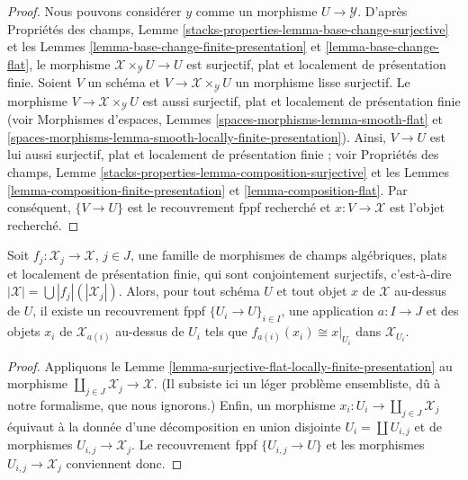 \begin{proof}
Nous pouvons considérer $y$ comme un morphisme $U \to \mathcal{Y}$. D'après
Propriétés des champs, Lemme
\ref{stacks-properties-lemma-base-change-surjective}
et les Lemmes \ref{lemma-base-change-finite-presentation} et
\ref{lemma-base-change-flat}, le morphisme
$\mathcal{X} \times_\mathcal{Y} U \to U$ est surjectif, plat et localement de
présentation finie. Soient $V$ un schéma et
$V \to \mathcal{X} \times_\mathcal{Y} U$ un morphisme lisse surjectif.
Le morphisme $V \to \mathcal{X} \times_\mathcal{Y} U$ est aussi surjectif,
plat et localement de présentation finie (voir
Morphismes d'espaces, Lemmes
\ref{spaces-morphisms-lemma-smooth-flat} et
\ref{spaces-morphisms-lemma-smooth-locally-finite-presentation}). Ainsi,
$V \to U$ est lui aussi surjectif, plat et localement de présentation finie ;
voir Propriétés des champs, Lemme
\ref{stacks-properties-lemma-composition-surjective}
et les Lemmes \ref{lemma-composition-finite-presentation} et
\ref{lemma-composition-flat}. Par conséquent, $\{V \to U\}$ est le
recouvrement fppf recherché et $x : V \to \mathcal{X}$ est l'objet recherché.
\end{proof}

\begin{lemma}
\label{lemma-surjective-family-flat-locally-finite-presentation}
Soit $f_j : \mathcal{X}_j \to \mathcal{X}$, $j \in J$, une famille de
morphismes de champs algébriques, plats et localement de présentation finie,
qui sont conjointement surjectifs, c'est-à-dire
$|\mathcal{X}| = \bigcup |f_j|(|\mathcal{X}_j|)$.
Alors, pour tout schéma $U$ et tout objet $x$ de $\mathcal{X}$ au-dessus de
$U$, il existe un recouvrement fppf $\{U_i \to U\}_{i \in I}$, une application
$a : I \to J$ et des objets $x_i$ de $\mathcal{X}_{a(i)}$ au-dessus de $U_i$
tels que $f_{a(i)}(x_i) \cong x|_{U_i}$ dans $\mathcal{X}_{U_i}$.
\end{lemma}

\begin{proof}
Appliquons le Lemme
\ref{lemma-surjective-flat-locally-finite-presentation} au morphisme
$\coprod_{j \in J} \mathcal{X}_j \to \mathcal{X}$. (Il subsiste ici un léger
problème ensembliste, dû à notre formalisme, que nous ignorons.) Enfin, un
morphisme $x_i : U_i \to \coprod_{j \in J} \mathcal{X}_j$ équivaut à la
donnée d'une décomposition en union disjointe
$U_i = \coprod U_{i, j}$ et de morphismes
$U_{i, j} \to \mathcal{X}_j$. Le recouvrement fppf
$\{U_{i, j} \to U\}$ et les morphismes
$U_{i, j} \to \mathcal{X}_j$ conviennent donc.
\end{proof}

